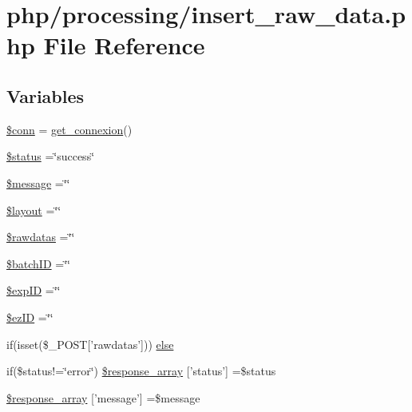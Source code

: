 \hypertarget{insert__raw__data_8php}{\section{php/processing/insert\-\_\-raw\-\_\-data.php File Reference}
\label{insert__raw__data_8php}
}
\subsection*{Variables}
\begin{DoxyCompactItemize}
\item 
\hyperlink{insert__raw__data_8php_aa8a5a87b9c1a6a0819b88447cbe41877}{\$conn} = \hyperlink{php__functions_8php_ace18bc10f3fd08f92688ac743e0d8c2e}{get\-\_\-connexion}()
\item 
\hyperlink{insert__raw__data_8php_a58391ea75f2d29d5d708d7050b641c33}{\$status} =\char`\"{}success\char`\"{}
\item 
\hyperlink{insert__raw__data_8php_abf17cb2dba2ed17cb28aa5f37deb5293}{\$message} =\char`\"{}\char`\"{}
\item 
\hyperlink{insert__raw__data_8php_a2b0d08e73a90b9443ce37506b7c6a544}{\$layout} =\char`\"{}\char`\"{}
\item 
\hyperlink{insert__raw__data_8php_abdab71b959b28075ae105e76f2bb59c4}{\$rawdatas} =\char`\"{}\char`\"{}
\item 
\hyperlink{insert__raw__data_8php_aaa6d122ea9cb55b210aadd86e5654a74}{\$batch\-I\-D} =\char`\"{}\char`\"{}
\item 
\hyperlink{insert__raw__data_8php_ae384d32e62e85e587cd27bf249ed3db3}{\$exp\-I\-D} =\char`\"{}\char`\"{}
\item 
\hyperlink{insert__raw__data_8php_addb1ec3ba55e413a08cb006ce21974df}{\$ez\-I\-D} =\char`\"{}\char`\"{}
\item 
if(isset(\$\-\_\-\-P\-O\-S\-T\mbox{[}'rawdatas'\mbox{]})) \hyperlink{insert__raw__data_8php_aa869f48d9730e52be32b3ada5833d2ac}{else}
\item 
if(\$status!=\char`\"{}error\char`\"{}) \hyperlink{insert__raw__data_8php_a47f5bcc722487ea6fe6ca2d1b5b870c1}{\$response\-\_\-array} \mbox{[}'status'\mbox{]} =\$status
\item 
\hyperlink{insert__raw__data_8php_afbd905fa933d965e67e5d4d1ff860553}{\$response\-\_\-array} \mbox{[}'message'\mbox{]} =\$message
\end{DoxyCompactItemize}


